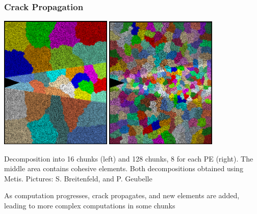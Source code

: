 \begin{frame}[fragile]
\frametitle{Crack Propagation}
\begin{centering}
\includegraphics[width=0.4\textwidth]{figures/chunkGraph16}
\includegraphics[width=0.4\textwidth]{figures/chunkGraph128}
\end{centering}
Decomposition into 16 chunks (left) and 128 chunks, 8 for each PE (right). The middle area contains cohesive elements. Both decompositions obtained using Metis. Pictures: S. Breitenfeld, and P. Geubelle

As computation progresses, crack propagates, and new elements are added, leading to more complex computations in some chunks
\end{frame}


